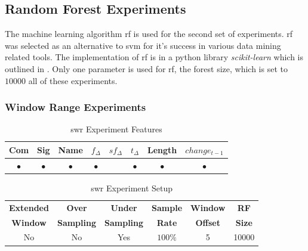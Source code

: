 \subsection{Random Forest Experiments}
\label{sec:rf_experiments}

The machine learning algorithm \gls{rf} is used for the second set of experiments. \gls{rf} was selected as an alternative to \gls{svm} for it's success in various data mining related tools. The implementation of \gls{rf} is in a python library \textit{scikit-learn} which is outlined in . Only one parameter is used for \gls{rf}, the forest size, which is set to $10000$ all of these experiments.

\subsubsection{Window Range Experiments}
\label{sec:rf_swr_experiment}

\begin{table}[h]
\begin{center}

    \begin{tabular}{|c|c|c|c|c|c|c|c|}
        \hline
        Com & Sig & Name & $f_{\Delta}$ & $sf_{\Delta}$ & $t_\Delta$ & Length & $change_{t-1}$ \\
         \hline
        $\bullet$ & $\bullet$ & $\bullet$ & $\bullet$ & & $\bullet$ & $\bullet$ & $\bullet$ \\ \hline
    \end{tabular}
    \caption{\gls{swr} Experiment Features}
    \label{tab:rf_window_range_experiment_features}
\end{center}

\end{table}

\begin{table}[h]
\begin{center}

    \begin{tabular}{|c|c|c|c|c|c|}
        \hline
        \textbf{Extended} & \textbf{Over} & \textbf{Under} & \textbf{Sample} & \textbf{Window} & \textbf{RF} \\
        \textbf{Window} & \textbf{Sampling} & \textbf{Sampling} & \textbf{Rate} & \textbf{Offset} & \textbf{Size} \\ \hline
        No & No & Yes & $100\%$ & 5 & 10000 \\ \hline
    \end{tabular}
    \caption{\gls{swr} Experiment Setup}
    \label{tab:rf_window_range_experiment_setup}
\end{center}

\end{table}

